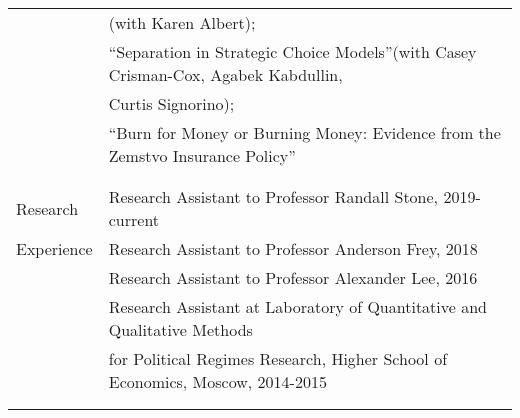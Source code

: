 \documentclass[letterpaper,11pt,oneside]{article}
\begin{document}
\begin{tabular}{@{} l l}
   &(with Karen Albert);\\
    &``Separation in Strategic Choice Models''(with Casey Crisman-Cox, Agabek Kabdullin,\\
   &  Curtis Signorino);\\
 & ``Burn for Money or Burning Money: Evidence from the Zemstvo Insurance Policy''\\
&\\
&\\
 \Large{Research} & Research Assistant to Professor Randall Stone, 2019-current\\
 \Large{Experience}&Research Assistant to Professor Anderson Frey, 2018\\
 & Research Assistant to Professor Alexander Lee, 2016\\
 & Research Assistant at Laboratory of Quantitative and Qualitative Methods \\
 &for Political Regimes Research, Higher School of Economics, Moscow, 2014-2015 \\
 &\\
 & \\
        \end{tabular}
 
\end{document}
